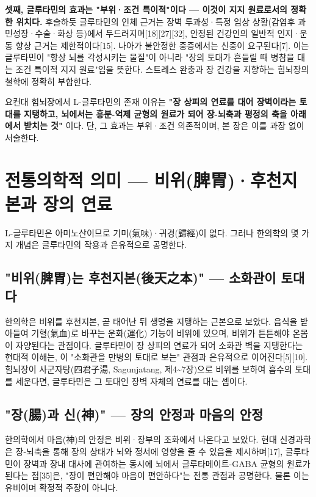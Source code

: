 \documentclass[11pt,oneside]{book}
\begin{document}
\textbf{셋째, 글루타민의 효과는 "부위·조건 특이적"이다 — 이것이 지지 원료로서의 정확한 위치다.} 후술하듯 글루타민의 인체 근거는 장벽 투과성·특정 임상 상황(감염후 과민성장·수술·화상 등)에서 두드러지며[18][27][32], 안정된 건강인의 일반적 인지·운동 향상 근거는 제한적이다[15]. 나아가 불안정한 중증에서는 신중이 요구된다[7]. 이는 글루타민이 "항상 뇌를 각성시키는 물질"이 아니라 "장의 토대가 흔들릴 때 병참을 대는 조건 특이적 지지 원료"임을 뜻한다. 스트레스 완충과 장 건강을 지향하는 힘뇌장의 철학에 정확히 부합한다.

요컨대 힘뇌장에서 L-글루타민의 존재 이유는 \textbf{"장 상피의 연료를 대어 장벽이라는 토대를 지탱하고, 뇌에서는 흥분-억제 균형의 원료가 되어 장-뇌축과 평정의 축을 아래에서 받치는 것"} 이다. 단, 그 효과는 부위·조건 의존적이며, 본 장은 이를 과장 없이 서술한다.

\section{전통의학적 의미 — 비위(脾胃)·후천지본과 장의 연료}
L-글루타민은 아미노산이므로 기미(氣味)·귀경(歸經)이 없다. 그러나 한의학의 몇 가지 개념은 글루타민의 작용과 은유적으로 공명한다.

\subsection{"비위(脾胃)는 후천지본(後天之本)" — 소화관이 토대다}
한의학은 비위를 후천지본, 곧 태어난 뒤 생명을 지탱하는 근본으로 보았다. 음식을 받아들여 기혈(氣血)로 바꾸는 운화(運化) 기능이 비위에 있으며, 비위가 튼튼해야 온몸이 자양된다는 관점이다. 글루타민이 장 상피의 연료가 되어 소화관 벽을 지탱한다는 현대적 이해는, 이 "소화관을 만병의 토대로 보는" 관점과 은유적으로 이어진다[5][10]. 힘뇌장이 사군자탕(四君子湯, Sagunjatang, 제4\textasciitilde{}7장)으로 비위를 보하여 흡수의 토대를 세운다면, 글루타민은 그 토대인 장벽 자체의 연료를 대는 셈이다.

\subsection{"장(腸)과 신(神)" — 장의 안정과 마음의 안정}
한의학에서 마음(神)의 안정은 비위·장부의 조화에서 나온다고 보았다. 현대 신경과학은 장-뇌축을 통해 장의 상태가 뇌와 정서에 영향을 줄 수 있음을 제시하며[17], 글루타민이 장벽과 장내 대사에 관여하는 동시에 뇌에서 글루타메이트-GABA 균형의 원료가 된다는 점[35]은, "장이 편안해야 마음이 편안하다"는 전통 관점과 공명한다. 물론 이는 유비이며 확정적 주장이 아니다.
\end{document}
